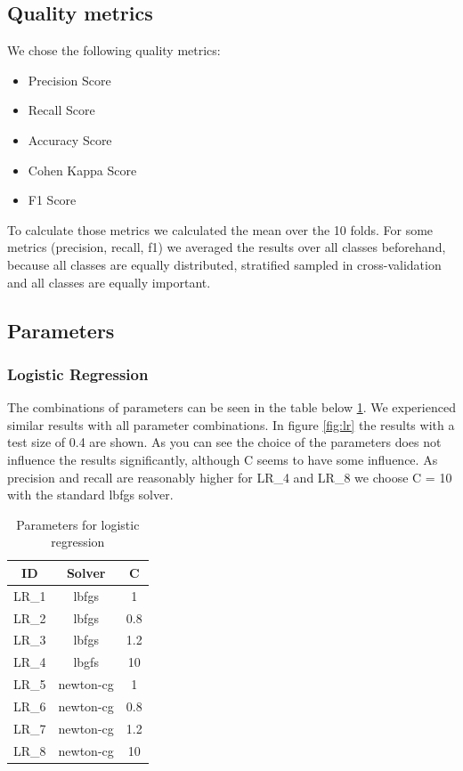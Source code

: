 \documentclass{sig-alternate-05-2015}
\begin{document}
\subsection{Quality metrics}

We chose the following quality metrics:
\begin{itemize}
	\item Precision Score
	\item Recall Score
	\item Accuracy Score
	\item Cohen Kappa Score
	\item F1 Score
\end{itemize}

To calculate those metrics we calculated the mean over the 10 folds.
For some metrics (precision, recall, f1) we averaged the results over all classes beforehand, because all classes are equally distributed, stratified sampled in cross-validation and all classes are equally important.

\subsection{Parameters}

\subsubsection{Logistic Regression}
The combinations of parameters can be seen in the table below \ref{tbl:logreg}.
We experienced similar results with all parameter combinations.
In figure \ref{fig:lr} the results with a test size of 0.4 are shown.
As you can see the choice of the parameters does not influence the results significantly, although C seems to have some influence.
As precision and recall are reasonably higher for LR\_4 and LR\_8 we choose C = 10 with the standard lbfgs solver.

\begin{table}[h]
\centering
\caption{Parameters for logistic regression}
\label{tbl:logreg}
\begin{tabular}{|c|c|c|}
\hline
ID & Solver & C \\ 
\hline 
LR\_1 & lbfgs & 1 \\ 
\hline 
LR\_2 & lbfgs & 0.8 \\ 
\hline 
LR\_3 & lbfgs & 1.2 \\ 
\hline 
LR\_4 & lbgfs & 10 \\ 
\hline 
LR\_5 & newton-cg & 1 \\ 
\hline 
LR\_6 & newton-cg & 0.8 \\ 
\hline 
LR\_7 & newton-cg & 1.2 \\ 
\hline 
LR\_8 & newton-cg & 10 \\ 
\hline
\end{tabular} 
\end{table}
\end{document}
